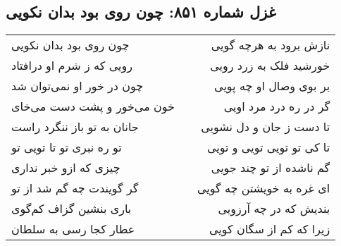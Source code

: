 \begin{center}
\section*{غزل شماره ۸۵۱: چون روی بود بدان نکویی}
\label{sec:851}
\begin{longtable}{l p{0.5cm} r}
چون روی بود بدان نکویی
&&
نازش برود به هرچه گویی
\\
رویی که ز شرم او درافتاد
&&
خورشید فلک به زرد رویی
\\
چون در خور او نمی‌توان شد
&&
بر بوی وصال او چه پویی
\\
خون می‌خور و پشت دست می‌خای
&&
گر در ره درد مرد اویی
\\
جانان به تو باز ننگرد راست
&&
تا دست ز جان و دل نشویی
\\
تو ره نبری تو تا تویی تو
&&
تا کی تو تویی تویی و تویی
\\
چیزی که ازو خبر نداری
&&
گم ناشده از تو چند جویی
\\
گر گویندت چه گم شد از تو
&&
ای غره به خویشتن چه گویی
\\
باری بنشین گزاف کم‌گوی
&&
بندیش که در چه آرزویی
\\
عطار کجا رسی به سلطان
&&
زیرا که کم از سگان کویی
\\
\end{longtable}
\end{center}

